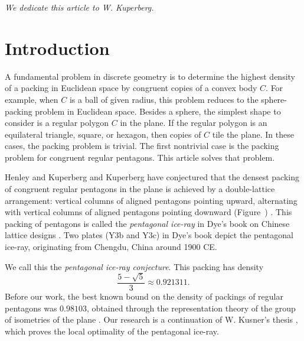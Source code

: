 \def\threepent#1#2#3#4#5#6#7#8#9{%
\pen{#1}{#2}{#3};
\pen{#4}{#5}{#6};
\pen{#7}{#8}{#9};
\draw[blue] (#1,#2) -- (#4,#5) -- (#7,#8) -- cycle
}

\def\threepentnoD#1#2#3#4#5#6#7#8#9{%
\pen{#1}{#2}{#3};
\pen{#4}{#5}{#6};
\pen{#7}{#8}{#9}
}

\def\blankfig#1{\tikzfig{#1}{Insert graphic}
{
[scale=1]
\draw(0,) circle(1cm);
}}



\centerline{\it We dedicate this article to W. Kuperberg.}

\section{Introduction}\label{sec:intro} 

A fundamental problem in discrete geometry is to determine the highest
density of a packing in Euclidean space by congruent copies of a
convex body $C$.  For example, when $C$ is a ball of given radius,
this problem reduces to the sphere-packing problem in Euclidean space.
Besides a sphere, the simplest shape to consider is a regular polygon
$C$ in the plane.  If the regular polygon is an equilateral
triangle, square, or hexagon, then copies of $C$ tile the plane.  In
these cases, the packing problem is trivial.  The first nontrivial
case is the packing problem for congruent regular pentagons.  This
article solves that problem.

Henley and Kuperberg and Kuperberg have conjectured that the densest
packing of congruent regular pentagons in the plane is achieved by a
double-lattice arrangement: vertical columns of aligned pentagons
pointing upward, alternating with vertical columns of aligned
pentagons pointing downward (Figure~)
\cite{Kup} \cite[p.801]{henley}.  This packing of pentagons is called
the {\it pentagonal ice-ray} in Dye's book on Chinese lattice designs
\cite{dye}.  Two plates (Y3b and Y3c) in Dye's book depict the
pentagonal ice-ray, originating from Chengdu, China around 1900 CE.

 We call this the {\it pentagonal ice-ray  conjecture}.
This packing has density
\[
\frac{5 - \sqrt{5}}3 \approx 0.921311.
\] %
Before our work, the best known bound on the density of packings of
regular pentagons was $0.98103$, obtained through the representation
theory of the group of isometries of the plane \cite{Val}.  Our
research is a continuation of W. Kusner's thesis \cite{Kus}, which
proves the local optimality of the pentagonal ice-ray.

